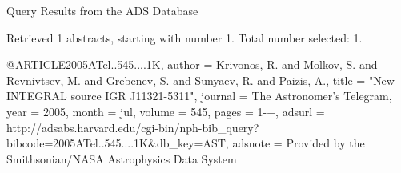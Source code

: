 Query Results from the ADS Database


Retrieved 1 abstracts, starting with number 1.  Total number selected: 1.

@ARTICLE{2005ATel..545....1K,
   author = {{Krivonos}, R. and {Molkov}, S. and {Revnivtsev}, M. and {Grebenev}, S. and 
	{Sunyaev}, R. and {Paizis}, A.},
    title = "{New INTEGRAL source IGR J11321-5311}",
  journal = {The Astronomer's Telegram},
     year = 2005,
    month = jul,
   volume = 545,
    pages = {1-+},
   adsurl = {http://adsabs.harvard.edu/cgi-bin/nph-bib_query?bibcode=2005ATel..545....1K&db_key=AST},
  adsnote = {Provided by the Smithsonian/NASA Astrophysics Data System}
}


